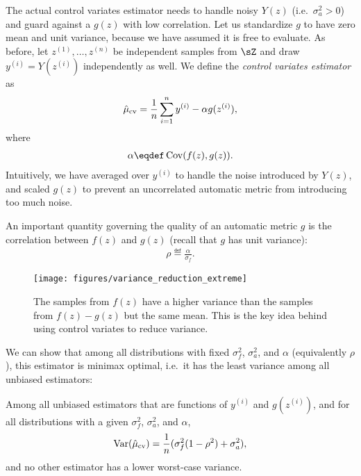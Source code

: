 The actual control variates estimator needs to
handle noisy $Y(z)$ (i.e.\ $\sigma^2_a > 0$) and
guard against a $g(z)$ with low correlation.
Let us standardize $g$ to have zero mean and unit variance, because we have
assumed it is free to evaluate.
As before, let $z^{(1)}, \dots, z^{(n)}$ be independent samples from $\sZ$ and
draw $y^{(i)} = Y(z^{(i)})$ independently as well.
We define the \emph{control variates estimator} as
\begin{align}
\hat \mu_\text{cv} = \frac{1}{n} \sum_{i=1}^n y^{(i)} - \alpha g(z^{(i)}),
\end{align}
where
\begin{align}
  \alpha \eqdef \Cov(f(z),g(z)).
\end{align}
Intuitively, we have averaged over $y^{(i)}$ to handle the noise introduced by $Y(z)$, and scaled $g(z)$ to prevent an uncorrelated automatic metric from introducing too much noise.

An important quantity governing the quality of an automatic metric $g$
is the correlation between $f(z)$ and $g(z)$ (recall that $g$ has unit variance):
\begin{align}
\rho \eqdef \frac{\alpha}{\sigma_f}.  %
\end{align}

\begin{figure}
\centering
  \texttt{[image: figures/variance\_reduction\_extreme]}
  \caption[Intuition for control variates]{\label{fig:variance_reduction}
  The samples from $f(z)$ have a higher variance than the samples
  from $f(z)-g(z)$ but the same mean. This is the key idea behind using control variates to reduce variance.}
\end{figure}

We can show that among all distributions with
fixed $\sigma^2_f$, $\sigma^2_a$, and $\alpha$ (equivalently $\rho$), this estimator is minimax optimal, i.e.\ it has the least variance among all unbiased estimators:

\begin{theorem}
\label{thm:main}
Among all unbiased
  estimators that are functions of $y^{(i)}$ and $g(z^{(i)})$, and for all distributions with a given $\sigma^2_f$, $\sigma^2_a$, and $\alpha$,
\begin{align}
  \label{eqn:varcontrol}
  \operatorname{Var}(\hat \mu_\text{cv}) = \frac{1}{n} (\sigma^2_f (1 - \rho^2) + \sigma^2_a),
\end{align}
and no other estimator has a lower worst-case variance.
\end{theorem}


